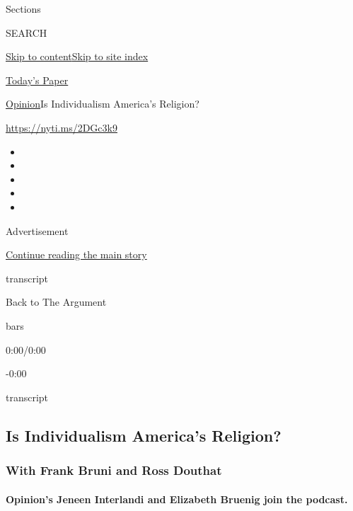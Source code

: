 Sections

SEARCH

\protect\hyperlink{site-content}{Skip to
content}\protect\hyperlink{site-index}{Skip to site index}

\href{https://myaccount.nytimes3xbfgragh.onion/auth/login?response_type=cookie\&client_id=vi}{}

\href{https://www.nytimes3xbfgragh.onion/section/todayspaper}{Today's
Paper}

\href{/section/opinion}{Opinion}\textbar{}Is Individualism America's
Religion?

\url{https://nyti.ms/2DGc3k9}

\begin{itemize}
\item
\item
\item
\item
\item
\end{itemize}

Advertisement

\protect\hyperlink{after-top}{Continue reading the main story}

transcript

Back to The Argument

bars

0:00/0:00

-0:00

transcript

\hypertarget{is-individualism-americas-religion}{%
\subsection{Is Individualism America's
Religion?}\label{is-individualism-americas-religion}}

\hypertarget{with-frank-bruni-and-ross-douthat}{%
\subsubsection{With Frank Bruni and Ross
Douthat}\label{with-frank-bruni-and-ross-douthat}}

\hypertarget{opinions-jeneen-interlandi-and-elizabeth-bruenig-join-the-podcast}{%
\paragraph{Opinion's Jeneen Interlandi and Elizabeth Bruenig join the
podcast.}\label{opinions-jeneen-interlandi-and-elizabeth-bruenig-join-the-podcast}}

